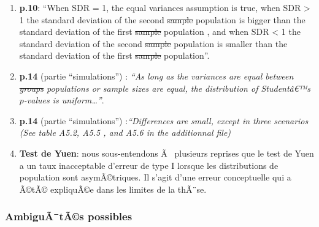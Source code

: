 \begin{appendix}
\begin{enumerate}
\def\labelenumi{\arabic{enumi})}
\setcounter{enumi}{1}
\item
  \color{black}\textbf{p.10}: ``When SDR = 1, the equal variances
  assumption is true, when SDR \textgreater{} 1 the standard deviation
  of the second \sout{sample} \color{blue} population \color{black} is
  bigger than the standard deviation of the first \sout{sample}
  \color{blue} population \color{black}, and when SDR \textless{} 1 the
  standard deviation of the second \sout{sample} \color{blue}population
  \color{black} is smaller than the standard deviation of the first
  \sout{sample} \color{blue} population''. \color{black}
\item
  \textbf{p.14} (partie ``simulations'') : \emph{``As long as the
  variances are equal between \sout{groups} \color{blue} populations
  \color{black} or sample sizes are equal, the distribution of
  Studentâ€™s \(p\)-values is uniform\ldots{}''}.
\item
  \textbf{p.14} (partie ``simulations'') :\emph{``Differences are small,
  except in three scenarios (See table A5.2, A5.5 , and A5.6 in the
  additionnal file)}
\item
  \textbf{Test de Yuen}: nous sous-entendons Ã~ plusieurs reprises que
  le test de Yuen a un taux inacceptable d'erreur de type I lorsque les
  distributions de population sont asymÃ©triques. Il s'agit d'une erreur
  conceptuelle qui a Ã©tÃ© expliquÃ©e dans les limites de la thÃ¨se.
\end{enumerate}

\hypertarget{ambiguuxe3tuxe3s-possibles}{%
\subsubsection{AmbiguÃ¯tÃ©s
possibles}\label{ambiguuxe3tuxe3s-possibles}}


\end{appendix}

